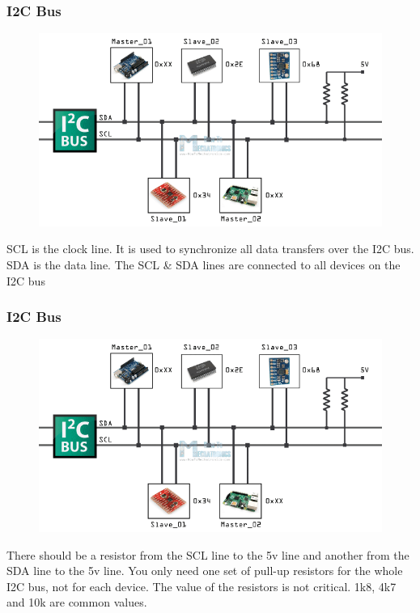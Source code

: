 \begin{frame}
	\frametitle{I2C Bus}
	\begin{figure}
		\includegraphics[scale=.35]{assets/i2c}  
	\end{figure}
	SCL is the clock line. It is used to synchronize all data transfers over the I2C bus. 
	SDA is the data line. 
	The SCL \& SDA lines are connected to all devices on the I2C bus
\end{frame}

\begin{frame}
	\frametitle{I2C Bus}
	\begin{figure}
		\includegraphics[scale=.25]{assets/i2c}  
	\end{figure}
	There should be a resistor from the SCL line to the 5v line and another from the SDA line to the 5v line. You only need one set of pull-up resistors for the whole I2C bus, not for each device. The value of the resistors is not critical. 1k8, 4k7 and 10k are common values.
\end{frame}

